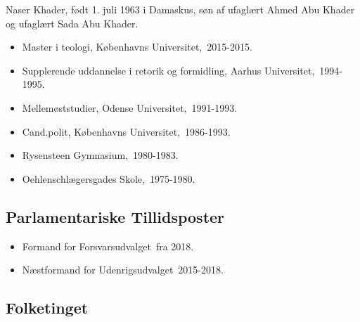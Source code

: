 \documentclass[11pt, a4paper]{awesome-cv}
\begin{document}
\makecvheader[R]
\makelettertitle
\begin{cvletter}
Naser Khader, født 1. juli 1963 i Damaskus, søn af ufaglært Ahmed Abu Khader og ufaglært Sada Abu Khader.

\begin{itemize}
\item Master i teologi, Københavns Universitet, 2015-2015.
\item Supplerende uddannelse i retorik og formidling, Aarhus Universitet, 1994-1995.
\item Mellemøststudier, Odense Universitet, 1991-1993.
\item Cand.polit, Københavns Universitet, 1986-1993.
\item Rysensteen Gymnasium, 1980-1983.
\item Oehlenschlægersgades Skole, 1975-1980.
\end{itemize}
\subsection*{Parlamentariske Tillidsposter}
\begin{itemize}
\item Formand for Forsvarsudvalget fra 2018.
\item Næstformand for Udenrigsudvalget 2015-2018.
\end{itemize}
\subsection*{Folketinget}

\end{cvletter}
\end{document}
